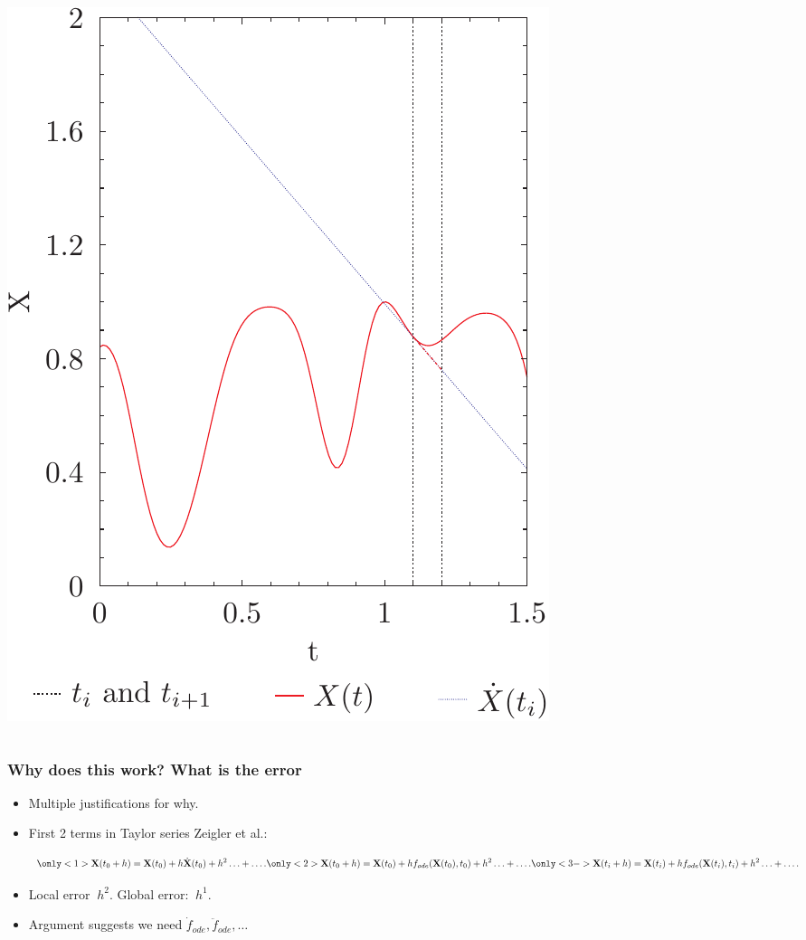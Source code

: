 \documentclass{beamer}
\begin{document}
\begin{frame}
\begin{columns}
\begin{column}{0.5\linewidth}
{\includegraphics[width=\linewidth]{euler_demo2.pdf}%
}%
\end{column}
\end{columns}
\end{frame}


\begin{frame}
\frametitle{Why does this work? What is the error}
\begin{itemize}
\item<1-> Multiple justifications for why.

\item<2-> First 2 terms in Taylor series {{\color{gray} Zeigler et al.}}:

\begin{equation*}
\only<1>{\mathbf{X}(t_{0}+h) = \mathbf{X}(t_{0})+h \dot{\mathbf{X}}(t_0)+h^2\ldots +\ldots.}
\only<2>{\mathbf{X}(t_{0}+h) = \mathbf{X}(t_{0})+h f_{ode}(\mathbf{X}(t_0),t_0)+h^2\ldots +\ldots.}
\only<3->{\mathbf{X}(t_{i}+h) = \mathbf{X}(t_{i})+h f_{ode}(\mathbf{X}(t_i),t_i)+h^2\ldots +\ldots.}
\end{equation*}

\item<3-> Local error  $~h^2$. Global error: $~h^1$.

\item<4-> Argument suggests we need $\dot{f}_{ode},\ddot{f}_{ode},\ldots$
\end{itemize}
\end{frame}
\end{document}

